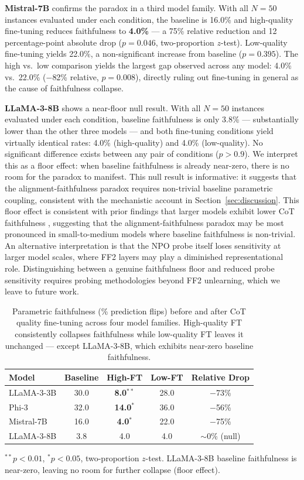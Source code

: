 \documentclass[11pt]{article}
\begin{document}
\textbf{Mistral-7B} confirms the paradox in a third model family. With all
$N{=}50$ instances evaluated under each condition, the baseline is 16.0\%
and high-quality fine-tuning reduces faithfulness to \textbf{4.0\%} --- a
75\% relative reduction and 12 percentage-point absolute drop ($p = 0.046$,
two-proportion $z$-test). Low-quality fine-tuning yields 22.0\%, a
non-significant increase from baseline ($p = 0.395$). The high vs.\ low
comparison yields the largest gap observed across any model: 4.0\% vs.\
22.0\% ($-$82\% relative, $p = 0.008$), directly ruling out fine-tuning
in general as the cause of faithfulness collapse.

\textbf{LLaMA-3-8B} shows a near-floor null result. With all $N{=}50$
instances evaluated under each condition, baseline faithfulness is only
3.8\% --- substantially lower than the other three models --- and both
fine-tuning conditions yield virtually identical rates: 4.0\% (high-quality)
and 4.0\% (low-quality). No significant difference exists between any pair
of conditions ($p > 0.9$). We interpret this as a floor effect: when baseline
faithfulness is already near-zero, there is no room for the paradox to manifest.
This null result is informative: it suggests that the alignment-faithfulness
paradox requires non-trivial baseline parametric coupling, consistent with the
mechanistic account in Section~\ref{sec:discussion}.
This floor effect is consistent with prior findings that larger
models exhibit lower CoT faithfulness \citep{lanham2023measuring},
suggesting that the alignment-faithfulness paradox may be
most pronounced in small-to-medium models where baseline
faithfulness is non-trivial.
An alternative interpretation is that the NPO probe itself loses sensitivity at
larger model scales, where FF2 layers may play a diminished representational
role. Distinguishing between a genuine faithfulness floor and reduced probe
sensitivity requires probing methodologies beyond FF2 unlearning, which we
leave to future work.

\begin{table}[t]
\centering
\caption{Parametric faithfulness (\% prediction flips) before and
after CoT quality fine-tuning across four model families.
High-quality FT consistently collapses faithfulness while
low-quality FT leaves it unchanged --- except LLaMA-3-8B,
which exhibits near-zero baseline faithfulness.}
\label{tab:main}
\begin{tabular}{lcccc}
\toprule
Model & Baseline & High-FT & Low-FT & Relative Drop \\
\midrule
LLaMA-3-3B & 30.0 & \textbf{8.0}$^{**}$ & 28.0 & $-$73\% \\
Phi-3       & 32.0 & \textbf{14.0}$^{*}$  & 36.0 & $-$56\% \\
Mistral-7B  & 16.0 & \textbf{4.0}$^{*}$   & 22.0 & $-$75\% \\
LLaMA-3-8B  & 3.8  & 4.0 & 4.0 & $\sim$0\% (null) \\
\bottomrule
\end{tabular}
\footnotesize{$^{**}p{<}0.01$, $^{*}p{<}0.05$, two-proportion $z$-test.
LLaMA-3-8B baseline faithfulness is near-zero, leaving no room for
further collapse (floor effect).}
\end{table}
\end{document}
